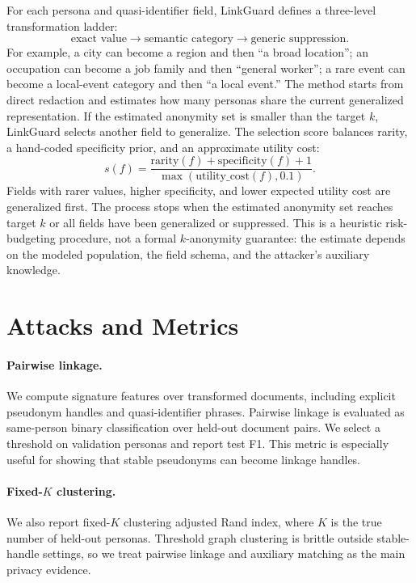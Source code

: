 \documentclass{article}
\newcommand{\method}{LinkGuard}
\begin{document}
For each persona and quasi-identifier field, \method{} defines a three-level transformation ladder:
\[
\text{exact value} \rightarrow \text{semantic category} \rightarrow \text{generic suppression}.
\]
For example, a city can become a region and then ``a broad location''; an occupation can become a job family and then ``general worker''; a rare event can become a local-event category and then ``a local event.''
The method starts from direct redaction and estimates how many personas share the current generalized representation.
If the estimated anonymity set is smaller than the target $k$, \method{} selects another field to generalize.
The selection score balances rarity, a hand-coded specificity prior, and an approximate utility cost:
\[
s(f) =
\frac{\mathrm{rarity}(f) + \mathrm{specificity}(f) + 1}
{\max(\mathrm{utility\_cost}(f), 0.1)}.
\]
Fields with rarer values, higher specificity, and lower expected utility cost are generalized first.
The process stops when the estimated anonymity set reaches target $k$ or all fields have been generalized or suppressed.
This is a heuristic risk-budgeting procedure, not a formal $k$-anonymity guarantee: the estimate depends on the modeled population, the field schema, and the attacker's auxiliary knowledge.

\section{Attacks and Metrics}

\paragraph{Pairwise linkage.}
We compute signature features over transformed documents, including explicit pseudonym handles and quasi-identifier phrases.
Pairwise linkage is evaluated as same-person binary classification over held-out document pairs.
We select a threshold on validation personas and report test F1.
This metric is especially useful for showing that stable pseudonyms can become linkage handles.

\paragraph{Fixed-$K$ clustering.}
We also report fixed-$K$ clustering adjusted Rand index, where $K$ is the true number of held-out personas.
Threshold graph clustering is brittle outside stable-handle settings, so we treat pairwise linkage and auxiliary matching as the main privacy evidence.
\end{document}
